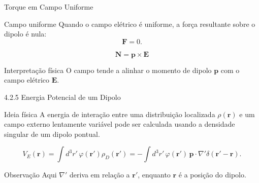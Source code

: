 \documentclass[aspectratio=169]{beamer}
\begin{document}
\begin{frame}{Torque em Campo Uniforme}

\begin{mybox}{Campo uniforme}
Quando o campo elétrico é uniforme, a força resultante sobre o dipolo é nula:
\[
\mathbf F=0.
\]
\end{mybox}

\begin{eqbox}
\begin{equation}
\mathbf N
=
\mathbf p\times\mathbf E
\tag{4.24a}
\end{equation}
\end{eqbox}

\begin{alertblock}{Interpretação física}
O campo tende a alinhar o momento de dipolo \(\mathbf p\) com o campo elétrico
\(\mathbf E\).
\end{alertblock}

\end{frame}


\begin{frame}{4.2.5 Energia Potencial de um Dipolo}

\begin{mybox}{Ideia física}
A energia de interação entre uma distribuição localizada \(\rho(\mathbf r)\)
e um campo externo lentamente variável pode ser calculada usando a densidade
singular de um dipolo pontual.
\end{mybox}

\begin{eqbox}
\begin{equation}
V_E(\mathbf r)
=
\int d^3r'\,\varphi(\mathbf r')\rho_D(\mathbf r')
=
-\int d^3r'\,\varphi(\mathbf r')\,
\mathbf p\cdot \nabla'\delta(\mathbf r'-\mathbf r).
\tag{4.25}
\label{eq:4.25}
\end{equation}
\end{eqbox}

\begin{mybox}{Observação}
Aqui \(\nabla'\) deriva em relação a \(\mathbf r'\), enquanto \(\mathbf r\) é a posição
do dipolo.
\end{mybox}

\end{frame}
\end{document}
